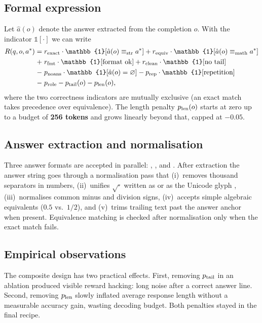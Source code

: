 \subsection{Formal expression}
Let $\hat a(o)$ denote the answer extracted from the completion $o$. With
the indicator $\mathbb{1}[\cdot]$ we can write
\begin{align}
R(q, o, a^{*})
&= \rExact \cdot \mathbb{1}[\hat a(o) \equiv_{\text{str}} a^{*}]
 + \rEquiv \cdot \mathbb{1}[\hat a(o) \equiv_{\text{math}} a^{*}] \notag\\
&\;{+}\; \rFmt \cdot \mathbb{1}[\text{format ok}]
 + \rClean \cdot \mathbb{1}[\text{no tail}] \notag\\
&\;{-}\; \pNoAns \cdot \mathbb{1}[\hat a(o) = \varnothing]
 - \pRep   \cdot \mathbb{1}[\text{repetition}] \notag\\
&\;{-}\; \pRole - \pTail(o) - \pLen(o),
\label{eq:reward}
\end{align}
where the two correctness indicators are mutually exclusive (an exact
match takes precedence over equivalence). The length penalty $p_{\text{len}}(o)$
starts at zero up to a budget of \textbf{256 tokens} and grows linearly
beyond that, capped at $-0.05$.

\subsection{Answer extraction and normalisation}
Three answer formats are accepted in parallel:
, , and
. After extraction the answer string goes
through a normalisation pass that
(i)~removes thousand separators in numbers,
(ii)~unifies $\sqrt{\cdot}$ written as  or as
the Unicode glyph \code{$\sqrt{\,}$},
(iii)~normalises common minus and division signs,
(iv)~accepts simple algebraic equivalents (\eg $0.5$ vs.\ $1/2$), and
(v)~trims trailing text past the answer anchor when present. Equivalence
matching is checked after normalisation only when the exact match fails.

\subsection{Empirical observations}
The composite design has two practical effects. First, removing $p_{\text{tail}}$
in an ablation produced visible reward hacking: long noise after a correct
answer line. Second, removing $p_{\text{len}}$ slowly inflated average response
length without a measurable accuracy gain, wasting decoding budget. Both
penalties stayed in the final recipe.
